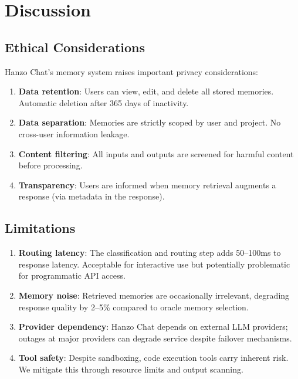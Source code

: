 \documentclass[11pt,twocolumn]{article}
\begin{document}
\section{Discussion}
\label{sec:discussion}

\subsection{Ethical Considerations}

Hanzo Chat's memory system raises important privacy considerations:

\begin{enumerate}[leftmargin=1.4em]
    \item \textbf{Data retention}: Users can view, edit, and delete all stored memories. Automatic deletion after 365 days of inactivity.
    \item \textbf{Data separation}: Memories are strictly scoped by user and project. No cross-user information leakage.
    \item \textbf{Content filtering}: All inputs and outputs are screened for harmful content before processing.
    \item \textbf{Transparency}: Users are informed when memory retrieval augments a response (via metadata in the response).
\end{enumerate}

\subsection{Limitations}

\begin{enumerate}[leftmargin=1.4em]
    \item \textbf{Routing latency}: The classification and routing step adds 50--100ms to response latency. Acceptable for interactive use but potentially problematic for programmatic API access.
    \item \textbf{Memory noise}: Retrieved memories are occasionally irrelevant, degrading response quality by 2--5\% compared to oracle memory selection.
    \item \textbf{Provider dependency}: Hanzo Chat depends on external LLM providers; outages at major providers can degrade service despite failover mechanisms.
    \item \textbf{Tool safety}: Despite sandboxing, code execution tools carry inherent risk. We mitigate this through resource limits and output scanning.
\end{enumerate}
\end{document}
